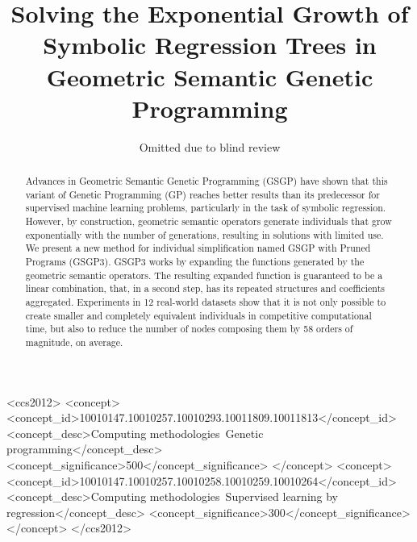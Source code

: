 \documentclass[sigconf, table]{acmart}
\begin{document}
	
	\title[Solving the Exponential Growth of Symbolic Regression Trees in GSGP]{Solving the Exponential Growth of Symbolic Regression Trees in Geometric Semantic Genetic Programming} 
	
	\author{Omitted due to blind review}
	
	\renewcommand{\shortauthors}{Ommited due to blind review}
	
	\begin{comment}
	\author{\Large Joao Francisco B. S. Martins, Luiz Otavio V. B. Oliveira, Luis F. Miranda, Felipe Casadei, Gisele L. Pappa}
	\affiliation{%
		\institution{Universidade Federal de Minas Gerais, Department of Computer Science}
		\city{Belo Horizonte} 
		\country{Brazil}
	}
	\email{[joaofbsm, luizvbo, luisfmiranda, casadei, glpappa]@dcc.ufmg.br}
	
	\renewcommand{\shortauthors}{Martins et al.}
	\end{comment}
	
	\begin{abstract}
		
		Advances in Geometric Semantic Genetic Programming (GSGP) have shown that this variant of Genetic Programming (GP) reaches better results than its predecessor for supervised machine learning problems, particularly in the task of symbolic regression. 
		However, by construction, geometric semantic operators generate individuals that grow exponentially with the number of generations, resulting in solutions with limited use.
		We present a new method for individual simplification named GSGP with Pruned Programs (GSGP3). 
GSGP3 works by expanding the functions generated by the geometric semantic operators. The resulting expanded function is guaranteed to be a linear combination, that, in a second step, has its repeated structures and coefficients aggregated.		
		Experiments in 12 real-world datasets show that it is not only possible to create smaller and completely equivalent individuals in competitive computational time, but also to reduce the number of nodes composing them by 58 orders of magnitude, on average.
		
	\end{abstract}
	
	\begin{CCSXML}
		<ccs2012>
		<concept>
		<concept_id>10010147.10010257.10010293.10011809.10011813</concept_id>
		<concept_desc>Computing methodologies~Genetic programming</concept_desc>
		<concept_significance>500</concept_significance>
		</concept>
		<concept>
		<concept_id>10010147.10010257.10010258.10010259.10010264</concept_id>
		<concept_desc>Computing methodologies~Supervised learning by regression</concept_desc>
		<concept_significance>300</concept_significance>
		</concept>
		</ccs2012>
	\end{CCSXML}
	
\end{document}
